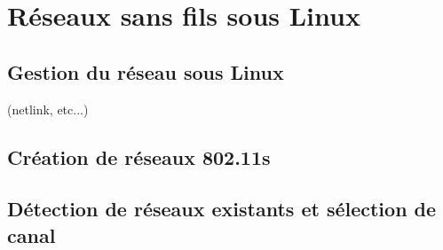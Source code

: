 \chapter{Réseaux sans fils sous Linux}
\section{Gestion du réseau sous Linux}
 (netlink, etc...)
\section{Création de réseaux 802.11s}
\section{Détection de réseaux existants et sélection de canal}